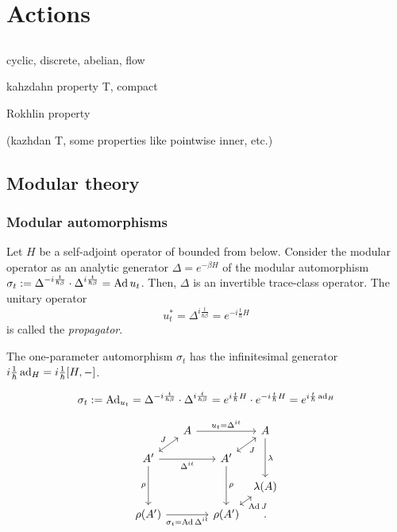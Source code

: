 \documentclass{../../large}
\begin{document}
\part{Actions}
\chapter{}
cyclic, discrete, abelian, flow

kahzdahn property T, compact

Rokhlin property

(kazhdan T, some properties like pointwise inner, etc.)





\chapter{Modular theory}






\section{Modular automorphisms}

\begin{rmk*}
Let $H$ be a self-adjoint operator of bounded from below.
Consider the modular operator as an analytic generator $\Delta=e^{-\beta H}$ of the modular automorphism $\sigma_t:=\Delta^{-i\frac t{\hbar\beta}}\cdot\Delta^{i\frac t{\hbar\beta}}=\operatorname{Ad} u_t$.
Then, $\Delta$ is an invertible trace-class operator.
The unitary operator
\[u_t^*=\Delta^{i\frac t{\hbar\beta}}=e^{-i\frac t\hbar H}\]
is called the \emph{propagator}.


The one-parameter automorphism $\sigma_t$ has the infinitesimal generator $i\frac1\hbar\operatorname{ad}_H=i\frac1\hbar[H,-]$.

\[\sigma_t:=\operatorname{Ad}_{u_t}=\Delta^{-i\frac t{\hbar\beta}}\cdot\Delta^{i\frac t{\hbar\beta}}=e^{i\frac t\hbar H}\cdot e^{-i\frac t\hbar H}=e^{i\frac t\hbar\operatorname{ad}_H}\]

\[\begin{tikzcd}[column sep={3.5em,between origins},row sep={2.5em,between origins}]
&A\ar{rr}{u_t=\Delta^{it}}&&A\ar{dd}{\lambda}\\
A'\ar[<->]{ur}{J}\ar[swap]{rr}{\Delta^{it}}\ar[swap]{dd}{\rho}&&A'\ar[<->,swap]{ur}{J}\ar{dd}{\rho}&\\
&&&\lambda(A)\\
\rho(A')\ar[swap]{rr}{\sigma_t=\Ad\Delta^{it}}&&\rho(A')\ar[<->,swap]{ur}{\Ad J}&.
\end{tikzcd}\]
\end{rmk*}
\end{document}
